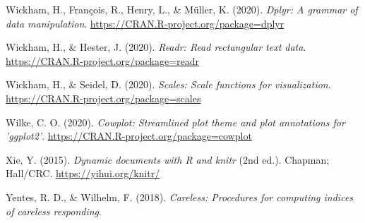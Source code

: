 \begin{appendix}
\leavevmode\hypertarget{ref-R-dplyr}{}%
Wickham, H., François, R., Henry, L., \& Müller, K. (2020). \emph{Dplyr:
A grammar of data manipulation}.
\url{https://CRAN.R-project.org/package=dplyr}

\leavevmode\hypertarget{ref-R-readr}{}%
Wickham, H., \& Hester, J. (2020). \emph{Readr: Read rectangular text
data}. \url{https://CRAN.R-project.org/package=readr}

\leavevmode\hypertarget{ref-R-scales}{}%
Wickham, H., \& Seidel, D. (2020). \emph{Scales: Scale functions for
visualization}. \url{https://CRAN.R-project.org/package=scales}

\leavevmode\hypertarget{ref-R-cowplot}{}%
Wilke, C. O. (2020). \emph{Cowplot: Streamlined plot theme and plot
annotations for 'ggplot2'}.
\url{https://CRAN.R-project.org/package=cowplot}

\leavevmode\hypertarget{ref-R-knitr}{}%
Xie, Y. (2015). \emph{Dynamic documents with R and knitr} (2nd ed.).
Chapman; Hall/CRC. \url{https://yihui.org/knitr/}

\leavevmode\hypertarget{ref-R-careless}{}%
Yentes, R. D., \& Wilhelm, F. (2018). \emph{Careless: Procedures for
computing indices of careless responding}.

\endgroup
\end{appendix}
